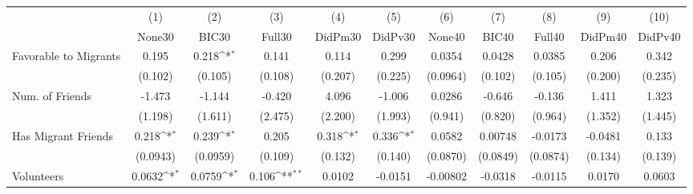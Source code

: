 {
\def\sym#1{\ifmmode^{#1}\else\(^{#1}\)\fi}
\begin{tabular}{l*{10}{c}}
\toprule
            &\multicolumn{1}{c}{(1)}&\multicolumn{1}{c}{(2)}&\multicolumn{1}{c}{(3)}&\multicolumn{1}{c}{(4)}&\multicolumn{1}{c}{(5)}&\multicolumn{1}{c}{(6)}&\multicolumn{1}{c}{(7)}&\multicolumn{1}{c}{(8)}&\multicolumn{1}{c}{(9)}&\multicolumn{1}{c}{(10)}\\
            &\multicolumn{1}{c}{None30}&\multicolumn{1}{c}{BIC30}&\multicolumn{1}{c}{Full30}&\multicolumn{1}{c}{DidPm30}&\multicolumn{1}{c}{DidPv30}&\multicolumn{1}{c}{None40}&\multicolumn{1}{c}{BIC40}&\multicolumn{1}{c}{Full40}&\multicolumn{1}{c}{DidPm40}&\multicolumn{1}{c}{DidPv40}\\
\midrule
Favorable to Migrants&       0.195         &       0.218\sym{*}  &       0.141         &       0.114         &       0.299         &      0.0354         &      0.0428         &      0.0385         &       0.206         &       0.342         \\
            &     (0.102)         &     (0.105)         &     (0.108)         &     (0.207)         &     (0.225)         &    (0.0964)         &     (0.102)         &     (0.105)         &     (0.200)         &     (0.235)         \\
\addlinespace
Num. of Friends&      -1.473         &      -1.144         &      -0.420         &       4.096         &      -1.006         &      0.0286         &      -0.646         &      -0.136         &       1.411         &       1.323         \\
            &     (1.198)         &     (1.611)         &     (2.475)         &     (2.200)         &     (1.993)         &     (0.941)         &     (0.820)         &     (0.964)         &     (1.352)         &     (1.445)         \\
\addlinespace
Has Migrant Friends&       0.218\sym{*}  &       0.239\sym{*}  &       0.205         &       0.318\sym{*}  &       0.336\sym{*}  &      0.0582         &     0.00748         &     -0.0173         &     -0.0481         &       0.133         \\
            &    (0.0943)         &    (0.0959)         &     (0.109)         &     (0.132)         &     (0.140)         &    (0.0870)         &    (0.0849)         &    (0.0874)         &     (0.134)         &     (0.139)         \\
\addlinespace
Volunteers  &      0.0632\sym{*}  &      0.0759\sym{*}  &       0.106\sym{**} &      0.0102         &     -0.0151         &    -0.00802         &     -0.0318         &     -0.0115         &      0.0170         &      0.0603         \\

\end{tabular}}
